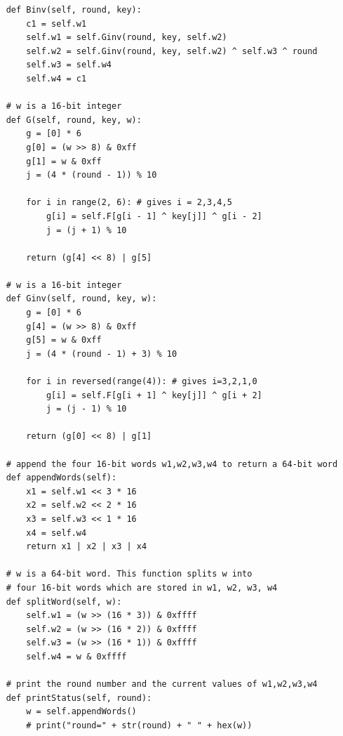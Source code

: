 \documentclass{article}
\begin{document}
\begin{verbatim}
    def Binv(self, round, key):
        c1 = self.w1
        self.w1 = self.Ginv(round, key, self.w2)
        self.w2 = self.Ginv(round, key, self.w2) ^ self.w3 ^ round
        self.w3 = self.w4
        self.w4 = c1

    # w is a 16-bit integer
    def G(self, round, key, w):
        g = [0] * 6
        g[0] = (w >> 8) & 0xff
        g[1] = w & 0xff
        j = (4 * (round - 1)) % 10

        for i in range(2, 6): # gives i = 2,3,4,5
            g[i] = self.F[g[i - 1] ^ key[j]] ^ g[i - 2]
            j = (j + 1) % 10

        return (g[4] << 8) | g[5]

    # w is a 16-bit integer
    def Ginv(self, round, key, w):
        g = [0] * 6
        g[4] = (w >> 8) & 0xff
        g[5] = w & 0xff
        j = (4 * (round - 1) + 3) % 10

        for i in reversed(range(4)): # gives i=3,2,1,0
            g[i] = self.F[g[i + 1] ^ key[j]] ^ g[i + 2]
            j = (j - 1) % 10

        return (g[0] << 8) | g[1]

    # append the four 16-bit words w1,w2,w3,w4 to return a 64-bit word
    def appendWords(self):
        x1 = self.w1 << 3 * 16
        x2 = self.w2 << 2 * 16
        x3 = self.w3 << 1 * 16
        x4 = self.w4
        return x1 | x2 | x3 | x4

    # w is a 64-bit word. This function splits w into
    # four 16-bit words which are stored in w1, w2, w3, w4
    def splitWord(self, w):
        self.w1 = (w >> (16 * 3)) & 0xffff
        self.w2 = (w >> (16 * 2)) & 0xffff
        self.w3 = (w >> (16 * 1)) & 0xffff
        self.w4 = w & 0xffff

    # print the round number and the current values of w1,w2,w3,w4
    def printStatus(self, round):
        w = self.appendWords()
        # print("round=" + str(round) + " " + hex(w))


\end{verbatim}
\end{document}
